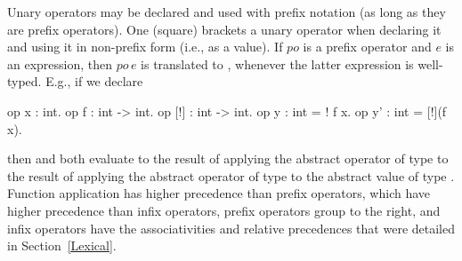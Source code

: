 Unary operators may be declared and used with prefix notation
(as long as they are prefix operators).
One (square) brackets a unary operator when
declaring it and using it in non-prefix form (i.e., as a value).
If $\mathit{po}$ is
a prefix operator and $e$ is an expression, then
$\mathit{po}\,e$ is translated to
, whenever the latter
expression is well-typed. E.g., if we declare
\begin{easycrypt}{}{}
op x : int.
op f : int -> int.
op [!] : int -> int.
op y : int = ! f x.
op y' : int = [!](f x).
\end{easycrypt}
then  and  both evaluate to the result of applying the
abstract operator \ec{!} of type  to the result of
applying the abstract operator  of type  to the
abstract value  of type .  Function application has
higher precedence than prefix operators, which have higher precedence
than infix operators, prefix operators group to the right, and infix
operators have the associativities and relative precedences that were
detailed in Section~\ref{Lexical}.

